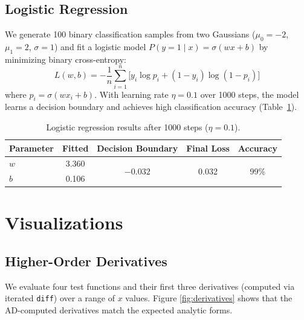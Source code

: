 \documentclass{article}
\begin{document}
\subsection{Logistic Regression}

We generate 100 binary classification samples from two Gaussians ($\mu_0 = -2$, $\mu_1 = 2$, $\sigma = 1$) and fit a logistic model $P(y=1 \mid x) = \sigma(wx + b)$ by minimizing binary cross-entropy:
\[
L(w, b) = -\frac{1}{n} \sum_{i=1}^{n} \bigl[ y_i \log p_i + (1 - y_i) \log(1 - p_i) \bigr]
\]
where $p_i = \sigma(w x_i + b)$. With learning rate $\eta = 0.1$ over 1000 steps, the model learns a decision boundary and achieves high classification accuracy (Table~\ref{tab:logistic}).

\begin{table}[ht]
\centering
\begin{tabular}{lcccc}
\hline
\textbf{Parameter} & \textbf{Fitted} & \textbf{Decision Boundary} & \textbf{Final Loss} & \textbf{Accuracy} \\
\hline
$w$ & 3.360 & \multirow{2}{*}{$-0.032$} & \multirow{2}{*}{0.032} & \multirow{2}{*}{99\%} \\
$b$ & 0.106 & & & \\
\hline
\end{tabular}
\caption{Logistic regression results after 1000 steps ($\eta = 0.1$).}
\label{tab:logistic}
\end{table}

\section{Visualizations}

\subsection{Higher-Order Derivatives}

We evaluate four test functions and their first three derivatives (computed via iterated \texttt{diff}) over a range of $x$ values. Figure \ref{fig:derivatives} shows that the AD-computed derivatives match the expected analytic forms.
\end{document}
